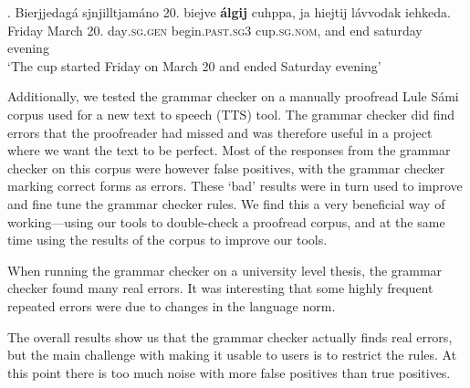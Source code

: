 \documentclass[free]{flammie}
\begin{document}
\exg. Bierjjedagá sjnjilltjamáno 20. biejve \textbf{álgij} cuhppa, ja hiejtij
lávvodak iehkeda.\label{biejve}\\
Friday March 20. day\textsc{.sg.gen} begin\textsc{.past.sg3}
cup\textsc{.sg.nom}, and end saturday evening\\
`The cup started Friday on March 20 and ended Saturday evening'



















































Additionally, we tested the grammar checker on a manually proofread Lule Sámi
corpus used for a new text to speech (TTS) tool. The grammar checker did find
errors that the proofreader had missed and was therefore useful in a project
where we want the text to be perfect. Most of the responses from the grammar
checker on this corpus were however false positives, with the grammar checker
marking correct forms as errors. These `bad' results were in turn used to
improve and fine tune the grammar checker rules. We find this a very beneficial
way of working---using our tools to  double-check a proofread corpus, and at the
same time using the results of the corpus to improve our tools.

When running the grammar checker on a university level thesis, the grammar
checker found many real errors. It was interesting that some highly frequent
repeated errors were due to changes in the language norm.

The overall results show us that the grammar checker actually finds real errors,
but the main challenge with making it usable to users is to restrict the rules.
At this point there is too much noise with more false positives than true
positives.
\end{document}
